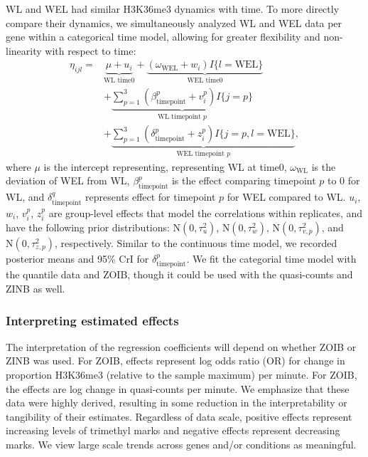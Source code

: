 \documentclass[11pt]{biorxiv}
\begin{document}
WL and WEL had similar H3K36me3 dynamics with time. To more directly compare their dynamics, we simultaneously analyzed WL and WEL data per gene within a categorical time model, allowing for greater flexibility and non-linearity with respect to time:
\begin{align}
	\eta_{ijl} = &\underbrace{\mu + u_{i}}_{\text{WL time0}} + \underbrace{(\omega_{\text{WEL}} + w_{i})I\{l = \text{WEL}\}}_{\text{WEL time0}} \\ 
	&+ \underbrace{\sum_{p = 1}^{3}(\beta_{\text{timepoint}}^{p} + v_{i}^{p})I\{j = p\}}_{\text{WL timepoint }p} \nonumber \\ 
	&+ \underbrace{\sum_{p = 1}^{3}(\delta_{\text{timepoint}}^{p} + z_{i}^{p})I\{j = p, l = \text{WEL}\}}_{\text{WEL timepoint }p},\nonumber
\end{align}
where $\mu$ is the intercept representing, representing WL at time0, $\omega_{\text{WL}}$ is the deviation of WEL from WL, $\beta_{\text{timepoint}}^{p}$ is the effect comparing timepoint $p$ to $0$ for WL, and $\delta_{\text{timepoint}}^{q}$ represents effect for timepoint $p$ for WEL compared to WL. $u_{i}$, $w_{i}$, $v_{i}^{p}$, $z_{i}^{p}$ are group-level effects that model the correlations within replicates, and have the following prior distributions: $\text{N}(0, \tau^{2}_{u})$, $\text{N}(0, \tau^{2}_{w})$, $\text{N}(0, \tau^{2}_{v,p})$, and $\text{N}(0, \tau^{2}_{z,p})$, respectively. 
Similar to the continuous time model, we recorded posterior means and 95\% CrI for $\delta_{\text{timepoint}}^{p}$. We fit the categorial time model with the quantile data and ZOIB, though it could be used with the quasi-counts and ZINB as well.

\subsubsection{Interpreting estimated effects}

The interpretation of the regression coefficients will depend on whether ZOIB or ZINB was used. For ZOIB, effects represent log odds ratio (OR) for change in proportion H3K36me3 (relative to the sample maximum) per minute. For ZOIB, the effects are log change in quasi-counts per minute. We emphasize that these data were highly derived, resulting in some reduction in the interpretability or tangibility of their estimates. Regardless of data scale, positive effects represent increasing levels of trimethyl marks and negative effects represent decreasing marks. We view large scale trends across genes and/or conditions as meaningful.
\end{document}
